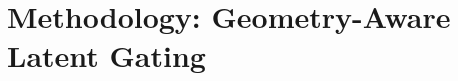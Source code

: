 \documentclass[11pt]{article}
\begin{document}
\section{Methodology: Geometry-Aware Latent Gating}

%
%
%
%
%
%
%
%
%
%
\end{document}
